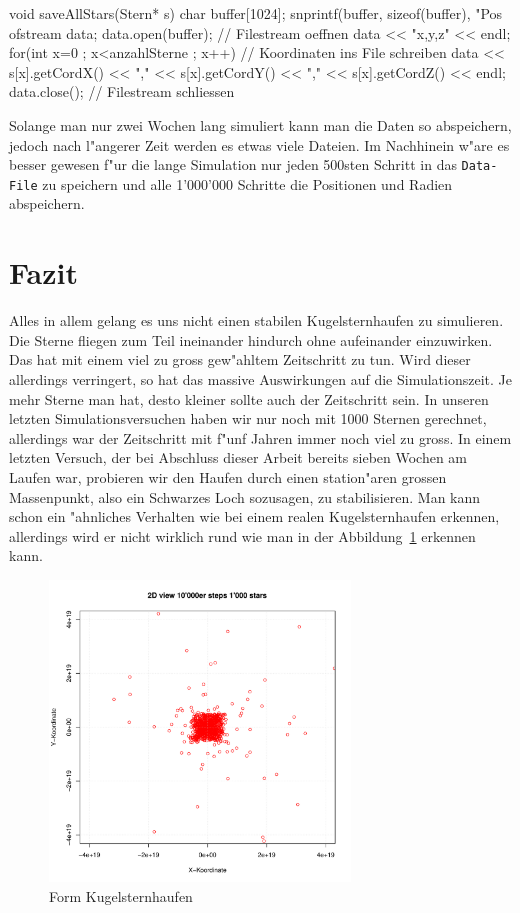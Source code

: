 \begin{refsection}
\begin{enumerate}
	\end{enumerate}
\begin{Cpp}
void saveAllStars(Stern* s) {
  char buffer[1024];
  snprintf(buffer, sizeof(buffer), "Pos%
  ofstream data;
  data.open(buffer);			          // Filestream oeffnen
  data << "x,y,z" << endl;
  for(int x=0 ; x<anzahlSterne ; x++){    // Koordinaten ins File schreiben
    data << s[x].getCordX() << "," << s[x].getCordY() << "," << s[x].getCordZ() << endl;
  }
  data.close();				         	  // Filestream schliessen
}
\end{Cpp}
	Solange man nur zwei Wochen lang simuliert kann man die Daten so abspeichern, jedoch nach l"angerer Zeit werden es etwas viele Dateien. Im Nachhinein w"are es besser gewesen f"ur die lange Simulation nur jeden 500sten Schritt in das \texttt{Data-File} zu speichern und alle 1'000'000 Schritte die Positionen und Radien abspeichern.

\section{Fazit}
	Alles in allem gelang es uns nicht einen stabilen Kugelsternhaufen zu simulieren. Die Sterne fliegen zum Teil ineinander hindurch ohne aufeinander einzuwirken. Das hat mit einem viel zu gross gew"ahltem Zeitschritt zu tun. Wird dieser allerdings verringert, so hat das massive Auswirkungen auf die Simulationszeit. Je mehr Sterne man hat, desto kleiner sollte auch der Zeitschritt sein.
	In unseren letzten Simulationsversuchen haben wir nur noch mit 1000 Sternen gerechnet, allerdings war der Zeitschritt mit f"unf Jahren immer noch viel zu gross.
	In einem letzten Versuch, der bei Abschluss dieser Arbeit bereits sieben Wochen am Laufen war, probieren wir den Haufen durch einen station"aren grossen Massenpunkt, also ein Schwarzes Loch sozusagen, zu stabilisieren.
	Man kann schon ein "ahnliches Verhalten wie bei einem realen Kugelsternhaufen erkennen, allerdings wird er nicht wirklich rund wie man in der Abbildung~\ref{Kugel.FormKug} erkennen kann. 
	\begin{figure}[h!]
		\begin{center}
				\includegraphics[width = 8cm]{kugel/images/quadrat.pdf}
		\end{center}
		\caption{Form Kugelsternhaufen
		\label{Kugel.FormKug}}
	\end{figure}\\

\printbibliography[heading=subbibliography]
\end{refsection}
